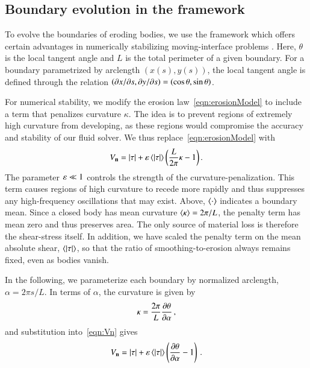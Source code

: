 \documentclass[preprint, 10pt]{elsarticle}
\begin{document}
\subsection{Boundary evolution in the {\thL} framework} 
\label{sec:thetaL}

To evolve the boundaries of eroding bodies, we use the {\thL} framework which offers certain advantages in numerically stabilizing moving-interface problems \cite{hou-low-she1994}. Here, $\theta$ is the local tangent angle and $L$ is the total perimeter of a given boundary. For a boundary parametrized by arclength $(x(s),y(s))$, the local tangent angle is defined through the relation $\left( \partial {x}/\partial {s}, \partial {y}/\partial {s} \right) = \left(\cos \theta, \sin \theta \right)$.

For numerical stability, we modify the erosion law~\eqref{eqn:erosionModel} to include a term that penalizes curvature $\kappa$. The idea is to prevent regions of extremely high curvature from developing, as these regions would compromise the accuracy and stability of our fluid solver. We thus replace~\eqref{eqn:erosionModel} with
\begin{align}
  \label{eqn:Vn}
  V_{\mathbf{n}} = \lvert \tau \rvert + \varepsilon \left< \lvert \tau \rvert \right> \left( \frac{L }{2\pi} \kappa - 1 \right).
\end{align}
The parameter $\varepsilon \ll 1$ controls the strength of the curvature-penalization. This term causes regions of high curvature to recede more rapidly and thus suppresses any high-frequency oscillations that may exist. Above, $\left< \cdot \right>$ indicates a boundary mean. Since a closed body has mean curvature $\left< \kappa \right> = 2\pi / L$, the penalty term has mean zero and thus preserves area. The only source of material loss is therefore the shear-stress itself. In addition, we have scaled the penalty term on the mean absolute shear, $\left< \lvert \tau \rvert \right>$, so that the ratio of smoothing-to-erosion always remains fixed, even as bodies vanish.

In the following, we parameterize each boundary by normalized arclength, $\alpha = 2 \pi s / L$. In terms of $\alpha$, the curvature is given by
\begin{align}
\kappa = \frac{2 \pi}{L} \frac{\partial \theta}{\partial \alpha} \, ,
\end{align}
and substitution into~\eqref{eqn:Vn} gives
\begin{align}
\label{eqn:Vn2}
V_{\mathbf{n}} = \lvert \tau \rvert +  \varepsilon \left< \lvert \tau \rvert \right>   \left(\frac{\partial \theta}{\partial \alpha} - 1 \right) \, .
\end{align}
\end{document}
